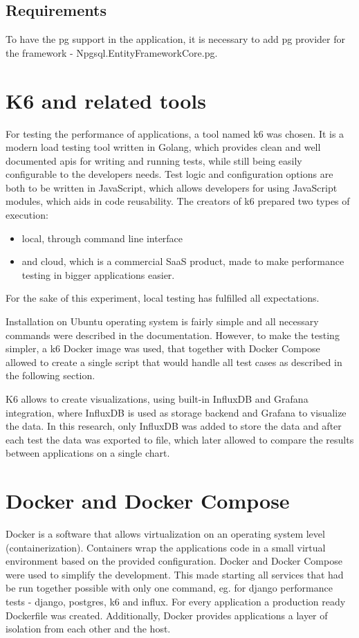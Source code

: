 \subsection{Requirements}

To have the \acrlong{pg} support in the application, it is necessary to add \acrshort{pg} provider for the framework - Npgsql.EntityFrameworkCore.\acrlong{pg}.

\section{K6 and related tools}

For testing the performance of applications, a tool named k6 was chosen. It is a modern load testing tool written in Golang, which provides clean and well documented \acrshort{api}s for writing and running tests, while still being easily configurable to the developers needs. Test logic and configuration options are both to be written in JavaScript, which allows developers for using JavaScript modules, which aids in code reusability. The creators of k6 prepared two types of execution:
\begin{itemize}
    \item local, through command line interface
    \item and cloud, which is a commercial SaaS product, made to make performance testing in bigger applications easier.
\end{itemize}
For the sake of this experiment, local testing has fulfilled all expectations.

Installation on Ubuntu operating system is fairly simple and all necessary commands were described in the documentation. However, to make the testing simpler, a k6 Docker image was used, that together with Docker Compose allowed to create a single script that would handle all test cases as described in the following section.

K6 allows to create visualizations, using built-in InfluxDB and Grafana integration, where InfluxDB is used as storage backend and Grafana to visualize the data. In this research, only InfluxDB was added to store the data and after each test the data was exported to file, which later allowed to compare the results between applications on a single chart.

\section{Docker and Docker Compose}

Docker is a software that allows virtualization on an operating system level (containerization). Containers wrap the applications code in a small virtual environment based on the provided configuration. Docker and Docker Compose were used to simplify the development. This made starting all services that had be run together possible with only one command, eg. for django performance tests - django, postgres, k6 and influx. For every application a production ready Dockerfile was created. Additionally, Docker provides applications a layer of isolation from each other and the host.
